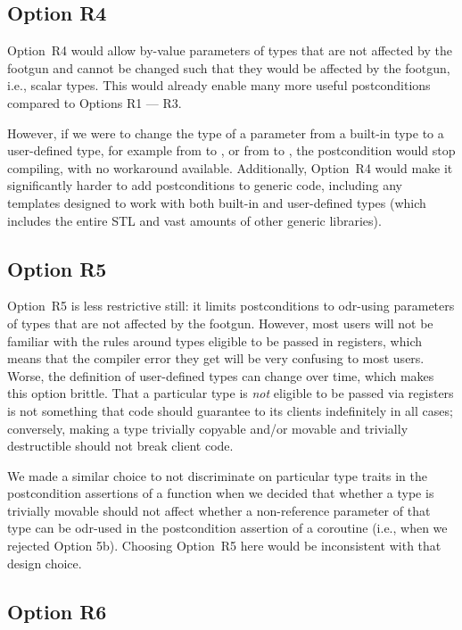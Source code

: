 \subsection*{Option R4}

Option~R4 would allow by-value parameters of types that are not affected by the footgun and cannot be changed such that they would be affected by the footgun, i.e., scalar types. This would already enable many more useful postconditions compared to Options R1 --- R3.

However, if we were to change the type of a parameter from a built-in type to a user-defined type, for example from  to , or from  to , the postcondition would stop compiling, with no workaround available. Additionally,  Option~R4 would make it significantly harder to add postconditions to generic code, including any templates designed to work with both built-in and user-defined types (which includes the entire STL and vast amounts of other generic libraries).

\subsection*{Option R5}

Option~R5 is less restrictive still: it limits postconditions to odr-using parameters of types that are not affected by the footgun. However, most users will not be familiar with the rules around types eligible to be passed in registers, which means that the compiler error they get will be very confusing to most users. Worse, the definition of user-defined types can change over time, which makes this option brittle. That a particular type is \emph{not} eligible to be passed via registers is not something that code should guarantee to its clients indefinitely in all cases; conversely, making a type trivially copyable and/or movable and trivially destructible should not break client code.

We made a similar choice to not discriminate on particular type traits in the postcondition assertions of a function when we decided that whether a type is trivially movable should not affect whether a non-reference parameter of that type can be odr-used in the postcondition assertion of a coroutine (i.e., when we rejected \cite{P3387R0} Option 5b). Choosing Option~R5 here would be inconsistent with that design choice.

\subsection*{Option R6}


